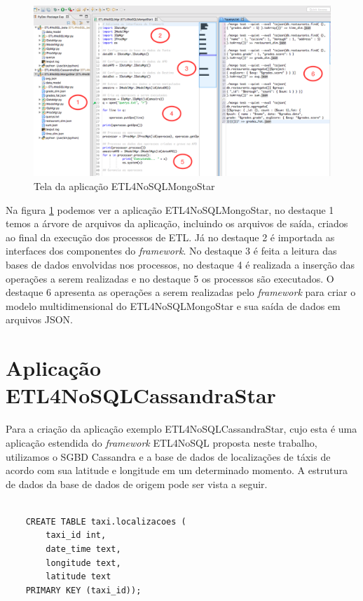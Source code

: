\begin{figure}[h!]
	\centering
	\includegraphics[scale=0.4]{fig/ETL4NoSQLMongoStar.png}
	\caption{Tela da aplicação ETL4NoSQLMongoStar}
	\label{etl4nosqlmongostar}
\end{figure}

Na figura \ref{etl4nosqlmongostar} podemos ver a aplicação ETL4NoSQLMongoStar, no destaque 1 temos a árvore de arquivos da aplicação, incluindo os arquivos de saída, criados ao final da execução dos processos de ETL. Já no destaque 2 é importada as interfaces dos componentes do \textit{framework}. No destaque 3 é feita a leitura das bases de dados envolvidas nos processos, no destaque 4 é realizada a inserção das operações a serem realizadas e no destaque 5 os processos são executados. O destaque 6 apresenta as operações a serem realizadas pelo \textit{framework} para criar o modelo multidimensional do ETL4NoSQLMongoStar e sua saída de dados em arquivos JSON.

\section{Aplicação ETL4NoSQLCassandraStar}

Para a criação da aplicação exemplo ETL4NoSQLCassandraStar, cujo esta é uma aplicação estendida do \textit{framework} ETL4NoSQL proposta neste trabalho, utilizamos o SGBD Cassandra e a base de dados de localizações de táxis de acordo com sua latitude e longitude em um determinado momento. A estrutura de dados da base de dados de origem pode ser vista a seguir.

\begin{lstlisting}[frame=single, language=Oberon-2, basicstyle=\tiny]

	CREATE TABLE taxi.localizacoes (  
		taxi_id int, 
		date_time text,
		longitude text,
		latitude text 
	PRIMARY KEY (taxi_id));

\end{lstlisting}

